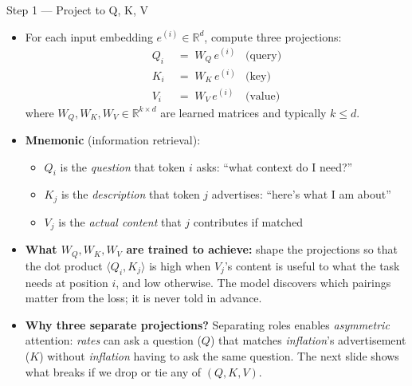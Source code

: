 \documentclass[10pt,english,aspectratio=169]{beamer}
\begin{document}
\begin{frame}{Step 1 --- Project to Q, K, V}
\begin{itemize}
\item For each input embedding $e^{(i)} \in \mathbb{R}^{d}$, compute three projections:
\begin{align*}
   Q_{i} &\;=\; W_{Q}\, e^{(i)} & \text{(query)}\\
   K_{i} &\;=\; W_{K}\, e^{(i)} & \text{(key)}\\
   V_{i} &\;=\; W_{V}\, e^{(i)} & \text{(value)}
\end{align*}
where $W_{Q}, W_{K}, W_{V} \in \mathbb{R}^{k \times d}$ are learned matrices and typically $k \le d$.

\medskip
\item \textbf{Mnemonic} (information retrieval):
\begin{itemize}
    \item $Q_i$ is the \emph{question} that token $i$ asks: ``what context do I need?''
    \item $K_j$ is the \emph{description} that token $j$ advertises: ``here's what I am about''
    \item $V_j$ is the \emph{actual content} that $j$ contributes if matched
\end{itemize}

\medskip
\item \textbf{What $W_{Q}, W_{K}, W_{V}$ are trained to achieve:} shape the projections so that the dot product $\langle Q_{i}, K_{j}\rangle$ is high when $V_{j}$'s content is useful to what the task needs at position $i$, and low otherwise. The model discovers which pairings matter from the loss; it is never told in advance.

\medskip
\item \textbf{Why three separate projections?} Separating roles enables \emph{asymmetric} attention: \textit{rates} can ask a question ($Q$) that matches \textit{inflation}'s advertisement ($K$) without \textit{inflation} having to ask the same question. The next slide shows what breaks if we drop or tie any of $(Q, K, V)$.
\end{itemize}
\end{frame}
\end{document}
